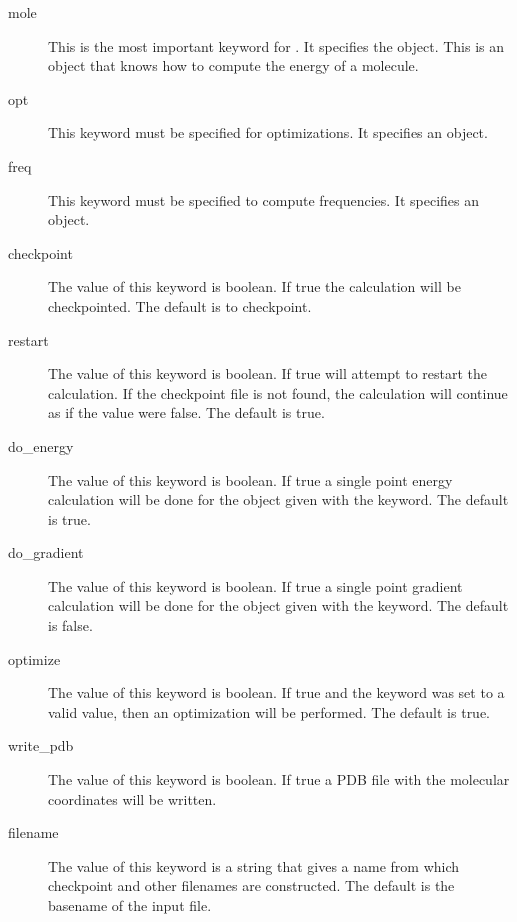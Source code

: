 \begin{description}
\item[{\ttfamily mole}] This is the most important keyword for
        .  It specifies the  object.
        This is an object that knows how to compute the energy of a
        molecule.
\item[{\ttfamily opt}] This keyword must be specified for optimizations.
        It specifies an  object.
\item[{\ttfamily freq}] This keyword must be specified to compute frequencies.
        It specifies an  object.
\item[{\ttfamily checkpoint}] The value of this keyword is boolean.  If
        true the calculation will be checkpointed.  The default is to
        checkpoint.
\item[{\ttfamily restart}] The value of this keyword is boolean.  If true
         will attempt to restart the calculation.  If the
        checkpoint file is not found, the calculation will continue as if
        the value were false. The default is true.
\item[{\ttfamily do\_energy}] The value of this keyword is boolean.  If
        true a single point energy calculation will be done for the
         object given with the 
        keyword.  The default is true.
\item[{\ttfamily do\_gradient}] The value of this keyword is boolean.  If
        true a single point gradient calculation will be done for the
         object given with the 
        keyword.  The default is false.
\item[{\ttfamily optimize}] The value of this keyword is boolean.  If
        true and the  keyword was set to a valid value,
        then an optimization will be performed.  The default is true.
\item[{\ttfamily write\_pdb}] The value of this keyword is boolean.  If
        true a PDB file with the molecular coordinates will be written.
\item[{\ttfamily filename}] The value of this keyword is a string that
        gives a name from which checkpoint and other filenames are
        constructed.  The default is the basename of the input file.
\end{description}

